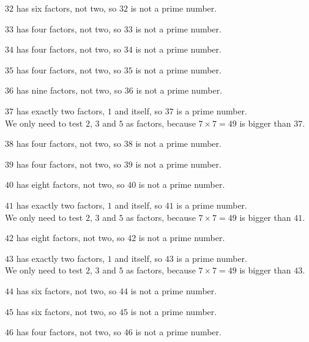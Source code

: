 \documentclass[aspectratio=169]{beamer}
\begin{document}
  {$32$ has six factors, not two, so $32$ is not a prime number.}

  {$33$ has four factors, not two, so $33$ is not a prime number.}

  {$34$ has four factors, not two, so $34$ is not a prime number.}

  {$35$ has four factors, not two, so $35$ is not a prime number.}

  {$36$ has nine factors, not two, so $36$ is not a prime number.}

  {$37$ has exactly two factors, $1$ and itself, so $37$ is a prime number.\\[0.45em]We only need to test $2$, $3$ and $5$ as factors, because $7\times 7=49$ is bigger than $37$.}

  {$38$ has four factors, not two, so $38$ is not a prime number.}

  {$39$ has four factors, not two, so $39$ is not a prime number.}

  {$40$ has eight factors, not two, so $40$ is not a prime number.}

  {$41$ has exactly two factors, $1$ and itself, so $41$ is a prime number.\\[0.45em]We only need to test $2$, $3$ and $5$ as factors, because $7\times 7=49$ is bigger than $41$.}

  {$42$ has eight factors, not two, so $42$ is not a prime number.}

  {$43$ has exactly two factors, $1$ and itself, so $43$ is a prime number.\\[0.45em]We only need to test $2$, $3$ and $5$ as factors, because $7\times 7=49$ is bigger than $43$.}

  {$44$ has six factors, not two, so $44$ is not a prime number.}

  {$45$ has six factors, not two, so $45$ is not a prime number.}

  {$46$ has four factors, not two, so $46$ is not a prime number.}
\end{document}
